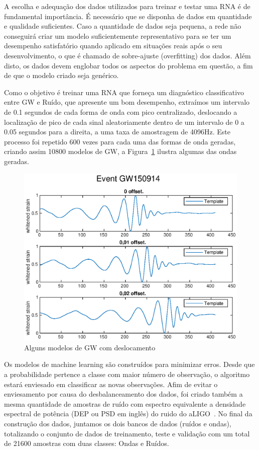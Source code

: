 A escolha e adequação dos dados utilizados para treinar e testar uma RNA é de fundamental importância. É necessário que se disponha de dados em quantidade e qualidade suficientes. Caso a quantidade de dados seja pequena, a rede não conseguirá criar um modelo suficientemente representativo para se ter um desempenho satisfatório quando aplicado em situações reais após o seu desenvolvimento, o que é chamado de sobre-ajuste (overfitting) dos dados. Além disto, os dados devem englobar todos os aspectos do problema em questão, a fim de que o modelo criado seja genérico. 

Como o objetivo é treinar uma RNA que forneça um diagnóstico classificativo entre GW e Ruído, que apresente um bom desempenho, extraímos um intervalo de 0.1 segundos de cada forma de onda com pico centralizado, deslocando a localização de pico de cada sinal aleatoriamente dentro de um intervalo de 0 a 0.05 segundos para a direita, a uma taxa de amostragem de 4096Hz. Este processo foi repetido 600 vezes para cada uma das formas de onda geradas, criando assim 10800 modelos de GW, a Figura~\ref{fig:gw150914-offset} ilustra algumas das ondas geradas.

\begin{figure}[ht]
    \centerline{\includegraphics[width=1\textwidth]{figuras/GW150914.eps}}
    \caption{Alguns modelos de GW com deslocamento}
    \label{fig:gw150914-offset}
\end{figure}

Os modelos de machine learning são construídos para minimizar erros. Desde que a probabilidade pertence a classe com maior número de observação, o algoritmo estará enviesado em classificar as novas observações. Afim de evitar o enviesamento por causa do desbalanceamento dos dados, foi criado também a mesma quantidade de amostras de ruído com espectro equivalente a densidade espectral de potência (DEP ou PSD em inglês) do ruido do aLIGO~\cite{T1800044}. No final da construção dos dados, juntamos os dois bancos de dados (ruídos e ondas), totalizando o conjunto de dados de treinamento, teste e validação com um total de 21600 amostras com duas classes: Ondas e Ruídos.

